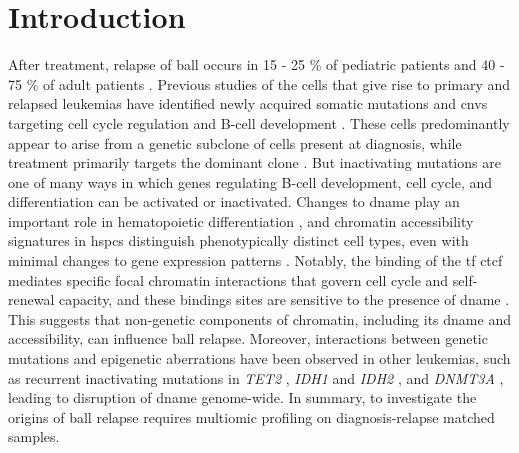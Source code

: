 \section{Introduction}

After treatment, relapse of \gls{ball} occurs in 15 - 25 \% of pediatric patients and 40 - 75 \% of adult patients \cite{inabaAcuteLymphoblasticLeukaemia2013,formanMythSecondRemission2013}.
Previous studies of the cells that give rise to primary and relapsed leukemias have identified newly acquired somatic mutations and \glspl{cnv} targeting cell cycle regulation and B-cell development \cite{mullighanGenomicAnalysisClonal2008}.
These cells predominantly appear to arise from a genetic subclone of cells present at diagnosis, while treatment primarily targets the dominant clone \cite{oshimaMutationalLandscapeClonal2016,oshimaMutationalFunctionalGenetics2020,maRiseFallSubclones2015,mullighanGenomicAnalysisClonal2008}.
But inactivating mutations are one of many ways in which genes regulating B-cell development, cell cycle, and differentiation can be activated or inactivated.
Changes to \gls{dname} play an important role in hematopoietic differentiation \cite{leeGlobalDNAMethylation2012,izzoDNAMethylationDisruption2020}, and chromatin accessibility signatures in \glspl{hspc} distinguish phenotypically distinct cell types, even with minimal changes to gene expression patterns \cite{takayamaTransitionQuiescentActivated2021}.
Notably, the binding of the \gls{tf} \gls{ctcf} mediates specific focal chromatin interactions that govern cell cycle and self-renewal capacity, and these bindings sites are sensitive to the presence of \gls{dname} \cite{takayamaTransitionQuiescentActivated2021,mauranoRoleDNAMethylation2015}.
This suggests that non-genetic components of chromatin, including its \gls{dname} and accessibility, can influence \gls{ball} relapse.
Moreover, interactions between genetic mutations and epigenetic aberrations have been observed in other leukemias, such as recurrent inactivating mutations in \emph{TET2} \cite{hirschConsequencesMutantTET22018,shihCombinationTargetedTherapy2017,duyRationalTargetingCooperating2019}, \emph{IDH1} and \emph{IDH2} \cite{shihCombinationTargetedTherapy2017,figueroaLeukemicIDH1IDH22010}, and \emph{DNMT3A} \cite{luEpigeneticPerturbationsArg882Mutated2016,yangDNMT3ALossDrives2016}, leading to disruption of \gls{dname} genome-wide.
In summary, to investigate the origins of \gls{ball} relapse requires multiomic profiling on diagnosis-relapse matched samples.

